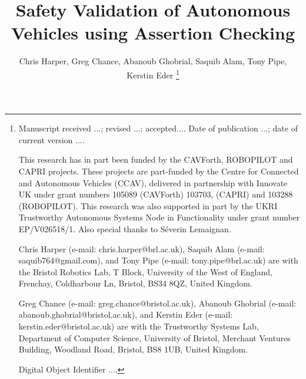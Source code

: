 \documentclass[letterpaper, 10 pt, journal, twoside]{IEEEtran}
\newcommand{\pathToSourceFiles}{../source}
\begin{document}
\title{Safety Validation of Autonomous Vehicles using Assertion Checking}

\author{Chris Harper, Greg Chance, Abanoub Ghobrial, Saquib Alam, Tony Pipe, Kerstin Eder
\thanks{{\footnotesize
Manuscript  
received ...;
revised ...;  
accepted.... 
Date of publication ...;
date of current version ....


This research has in part been funded by the CAVForth, ROBOPILOT and CAPRI projects. These projects are part-funded by the Centre for Connected and Autonomous Vehicles (CCAV), delivered in partnership with Innovate UK under grant numbers 105089 (CAVForth) 103703, (CAPRI) and 103288 (ROBOPILOT). This research was also supported in part by the UKRI Trustworthy Autonomous Systems Node in Functionality under grant number EP/V026518/1. Also special thanks to S\'everin Lemaignan.


Chris Harper (e-mail: chris.harper@brl.ac.uk),
Saquib Alam (e-mail: saquib764@gmail.com),
and
Tony Pipe (e-mail: tony.pipe@brl.ac.uk) 
are with the Bristol Robotics Lab, T Block, University of the West of England, Frenchay, Coldharbour Ln, Bristol, BS34 8QZ, United Kingdom. 

Greg Chance (e-mail: greg.chance@bristol.ac.uk), 
Abanoub Ghobrial (e-mail: abanoub.ghobrial@bristol.ac.uk), 
and 
Kerstin Eder (e-mail: kerstin.eder@bristol.ac.uk) 
are with the Trustworthy Systems Lab, Department of Computer Science, University of Bristol, Merchant Ventures Building, Woodland Road, Bristol, BS8 1UB, United Kingdom. 

Digital Object Identifier ....
}}}
%
%
\maketitle

\begin{abstract}
\noindent 

\end{abstract}
\end{document}
